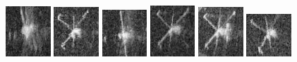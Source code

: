 \begin{figure}
    \centering
    
    \includegraphics[width=0.15\textwidth]{chapters/images/dataset/all-class-images/valve/valve-17.jpg}
    \includegraphics[width=0.15\textwidth]{chapters/images/dataset/all-class-images/valve/valve-110.jpg}
    \includegraphics[width=0.15\textwidth]{chapters/images/dataset/all-class-images/valve/valve-7.jpg}
    \includegraphics[width=0.15\textwidth]{chapters/images/dataset/all-class-images/valve/valve-137.jpg}
    \includegraphics[width=0.15\textwidth]{chapters/images/dataset/all-class-images/valve/valve-93.jpg}
    \includegraphics[width=0.15\textwidth]{chapters/images/dataset/all-class-images/valve/valve-204.jpg}
    

\end{figure}
